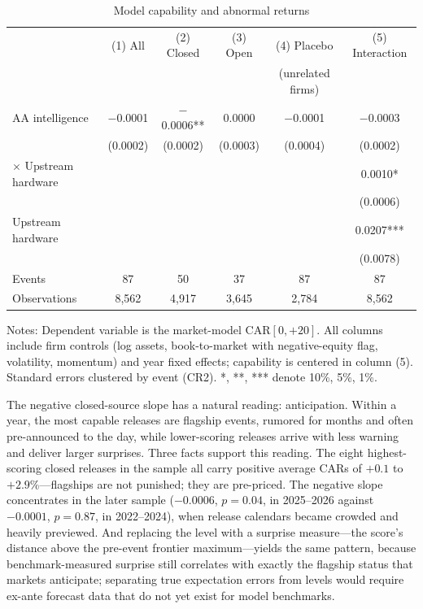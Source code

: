 \documentclass[review,12pt,authoryear]{elsarticle}
\begin{document}
\begin{table}[t!]
\centering
\begin{threeparttable}
\caption{Model capability and abnormal returns}\label{tab:capability}
\small
\begin{tabular}{lccccc}
\toprule
 & (1) All & (2) Closed & (3) Open & (4) Placebo & (5) Interaction \\
 &  &  &  & (unrelated firms) &  \\
\midrule
AA intelligence     & $-$0.0001 & $-$0.0006** & 0.0000 & $-$0.0001 & $-$0.0003 \\
                    & (0.0002) & (0.0002) & (0.0003) & (0.0004) & (0.0002) \\
$\times$ Upstream hardware & & & & & 0.0010* \\
                    & & & & & (0.0006) \\
Upstream hardware   & & & & & 0.0207*** \\
                    & & & & & (0.0078) \\
\midrule
Events              & 87 & 50 & 37 & 87 & 87 \\
Observations        & 8{,}562 & 4{,}917 & 3{,}645 & 2{,}784 & 8{,}562 \\
\bottomrule
\end{tabular}
\begin{tablenotes}\footnotesize
\item Notes: Dependent variable is the market-model CAR$[0,+20]$. All columns
include firm controls (log assets, book-to-market with negative-equity flag,
volatility, momentum) and year fixed effects; capability is centered in
column (5). Standard errors clustered by event (CR2). *, **, *** denote
10\%, 5\%, 1\%.
\end{tablenotes}
\end{threeparttable}
\end{table}

The negative closed-source slope has a natural reading: anticipation. Within
a year, the most capable releases are flagship events, rumored for months
and often pre-announced to the day, while lower-scoring releases arrive with
less warning and deliver larger surprises. Three facts support this reading.
The eight highest-scoring closed releases in the sample all carry positive
average CARs of $+0.1$ to $+2.9$\%---flagships are not punished; they are
pre-priced. The negative slope concentrates in the later sample ($-0.0006$,
$p=0.04$, in 2025--2026 against $-0.0001$, $p=0.87$, in 2022--2024), when
release calendars became crowded and heavily previewed. And replacing the
level with a surprise measure---the score's distance above the pre-event
frontier maximum---yields the same pattern, because benchmark-measured
surprise still correlates with exactly the flagship status that markets
anticipate; separating true expectation errors from levels would require
ex-ante forecast data that do not yet exist for model benchmarks.
\end{document}
